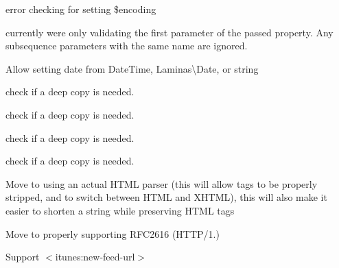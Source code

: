 \begin{DoxyRefList}
error checking for setting \$encoding  
\item[\doxylink{report_8contract_8php_a77b973d137fb33212e018b042df6e3e7}{Global(e)} \doxylink{class_sabre_1_1_card_d_a_v_1_1_plugin_a39cdcb2307e5da7d7a44da754db703d9}{Plugin\+::validate\+Param\+Filters} (array \$v\+Properties, array \$filters, \$test)]\label{todo__todo000036}%
%
currently we\textquotesingle{}re only validating the first parameter of the passed property. Any subsequence parameters with the same name are ignored. 
\item[Class \doxylink{class_laminas_1_1_mail_1_1_header_1_1_received}{Received} ]\label{todo__todo000010}%
%
Allow setting date from Date\+Time, Laminas\textbackslash{}\+Date, or string  
\item[\doxylink{report_8contract_8php_a77b973d137fb33212e018b042df6e3e7}{Global(e)} \doxylink{class_r_rule_1_1_r_set_a5d3bc50134fd5176b98b52a17b73a355}{RSet\+::get\+Dates} ()]\label{todo__todo000033}%
%
check if a deep copy is needed. 
\item[\doxylink{report_8contract_8php_a77b973d137fb33212e018b042df6e3e7}{Global(e)} \doxylink{class_r_rule_1_1_r_set_a74b999379466ac6aa3b900f879df6820}{RSet\+::get\+Ex\+Dates} ()]\label{todo__todo000034}%
%
check if a deep copy is needed. 
\item[\doxylink{report_8contract_8php_a77b973d137fb33212e018b042df6e3e7}{Global(e)} \doxylink{class_r_rule_1_1_r_set_a6a6088855d23677fc5403582c5636bb9}{RSet\+::get\+Ex\+Rules} ()]\label{todo__todo000032}%
%
check if a deep copy is needed. 
\item[\doxylink{report_8contract_8php_a77b973d137fb33212e018b042df6e3e7}{Global(e)} \doxylink{class_r_rule_1_1_r_set_af2dd38f574813c007c425005f7a6db4b}{RSet\+::get\+RRules} ()]\label{todo__todo000031}%
%
check if a deep copy is needed. 
\item[Espace de nommage \doxylink{namespace_simple_pie}{Simple\+Pie} ]\label{todo__todo000044}%
%
Move to using an actual HTML parser (this will allow tags to be properly stripped, and to switch between HTML and XHTML), this will also make it easier to shorten a string while preserving HTML tags 

\label{todo__todo000040}%
%
Move to properly supporting RFC2616 (HTTP/1.)  
\item[\doxylink{report_8contract_8php_a77b973d137fb33212e018b042df6e3e7}{Global(e)} \doxylink{class_simple_pie_a1b050737135acaff5113a6ae879286fb}{Simple\+Pie\+::subscribe\+\_\+url} (\$permanent=false)]\label{todo__todo000038}%
%
Support \texorpdfstring{$<$}{<}itunes\+:new-\/feed-\/url\texorpdfstring{$>$}{>} 




\end{DoxyRefList}
